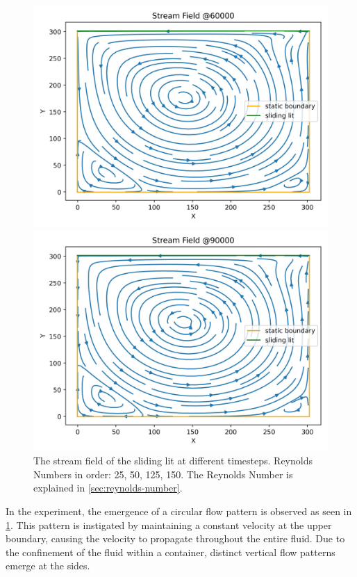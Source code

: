 \begin{figure}[H]
\begin{minipage}{0.5\textwidth}
        \includegraphics[width=\linewidth]{graphs/SlidingLit/stream_field_60000}
    \end{minipage}%
    \begin{minipage}{0.5\textwidth}
        \includegraphics[width=\linewidth]{graphs/SlidingLit/stream_field_90000}
    \end{minipage}
    \caption{
        The stream field of the sliding lit at different timesteps. Reynolds Numbers in order: 25, 50, 125, 150. The Reynolds Number is explained in \cref{sec:reynolds-number}.
    }
    \label{fig:sl-stream-field}
\end{figure}

In the experiment, the emergence of a circular flow pattern is observed as seen in \cref{fig:sl-stream-field}.
This pattern is instigated by maintaining a constant velocity at the upper boundary, causing the velocity to propagate throughout the entire fluid.
Due to the confinement of the fluid within a container, distinct vertical flow patterns emerge at the sides.

